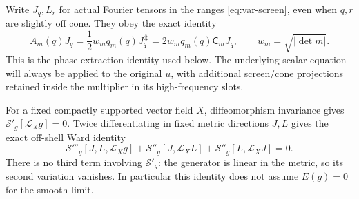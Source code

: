 \documentclass[11pt,a4paper]{article}
\numberwithin{equation}{section}
\newcommand{\f}[2]{\frac{#1}{#2}}
\theoremstyle{definition}
\begin{document}
Write $J_q,L_r$ for actual Fourier tensors in the ranges
\eqref{eq:var-screen}, even when $q,r$ are slightly off cone. They obey
the exact identity
\begin{equation*}
A_m(q)J_q=\f12w_m q_m(q)J_q^{\sharp\sharp}
        =2w_m q_m(q)\mathsf C_mJ_q,
\qquad w_m=\sqrt{|\det m|}.
\end{equation*}
This is the phase-extraction identity used below. The underlying scalar
equation will always be applied to the original $u$, with additional
screen/cone projections retained inside the multiplier in its high-frequency slots.

For a fixed compactly supported vector field $X$, diffeomorphism
invariance gives $\mathcal S'_g[\mathcal L_Xg]=0$.
Twice differentiating in fixed metric directions $J,L$ gives the exact
off-shell Ward identity
\begin{equation}\label{eq:var-ward}
\mathcal S'''_g[J,L,\mathcal L_Xg]
+\mathcal S''_g[J,\mathcal L_XL]
+\mathcal S''_g[L,\mathcal L_XJ]=0.
\end{equation}
There is no third term involving $\mathcal S'_g$: the generator is
linear in the metric, so its second variation vanishes. In particular
this identity does not assume $E(g)=0$ for the smooth limit.
\end{document}
